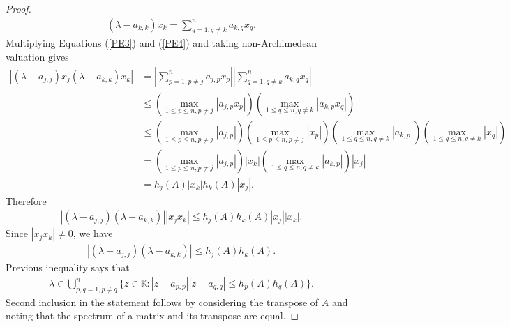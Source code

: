 \documentclass[10pt,a4paper]{amsart}
\begin{document}
\begin{proof}
\begin{align}
	(\lambda -a_{k,k})x_k=\sum_{q=1, q\neq k}^na_{k,q}x_q.
\end{align}
Multiplying Equations (\ref{PE3}) and (\ref{PE4}) and taking non-Archimedean valuation gives
\begin{align*}
|(\lambda -a_{j,j})x_j	(\lambda -a_{k,k})x_k|&=\left|\sum_{p=1, p\neq j}^na_{j,p}x_p\right|\left|\sum_{q=1, q\neq k}^na_{k,q}x_q\right|\\
&\leq \left(\max_{1\leq p \leq n, p \neq j}|a_{j,p}x_p|\right)\left(\max_{1\leq q \leq n, q \neq k}|a_{k,p}x_q|\right)\\
&\leq \left(\max_{1\leq p \leq n, p \neq j}|a_{j,p}|\right)\left(\max_{1\leq p \leq n, p \neq j}|x_p|\right)\left(\max_{1\leq q \leq n, q \neq k}|a_{k,p}|\right)\left(\max_{1\leq q \leq n, q \neq k}|x_q|\right)\\
&=\left(\max_{1\leq p \leq n, p \neq j}|a_{j,p}|\right)|x_k|\left(\max_{1\leq q \leq n, q \neq k}|a_{k,p}|\right)|x_j|\\
&=h_j(A)|x_k|h_k(A)|x_j|.
\end{align*}
Therefore 
\begin{align*}
|(\lambda -a_{j,j})(\lambda -a_{k,k})||x_jx_k|\leq h_j(A)h_k(A)|x_j||x_k|.
\end{align*}
Since $|x_jx_k|\neq0$, we have 
\begin{align*}
|(\lambda -a_{j,j})(\lambda -a_{k,k})|\leq h_j(A)h_k(A).	
\end{align*}
Previous inequality says that 
\begin{align*}
	\lambda  \in \bigcup_{p, q=1, p \neq q}^n\{z \in \mathbb{K}: |z-a_{p,p}||z-a_{q,q}|\leq h_p(A)h_q(A)\}.
\end{align*}
Second inclusion in the statement follows by considering the transpose of $A$ and noting that the spectrum of a matrix and its transpose are equal.	
\end{proof}
\end{document}
